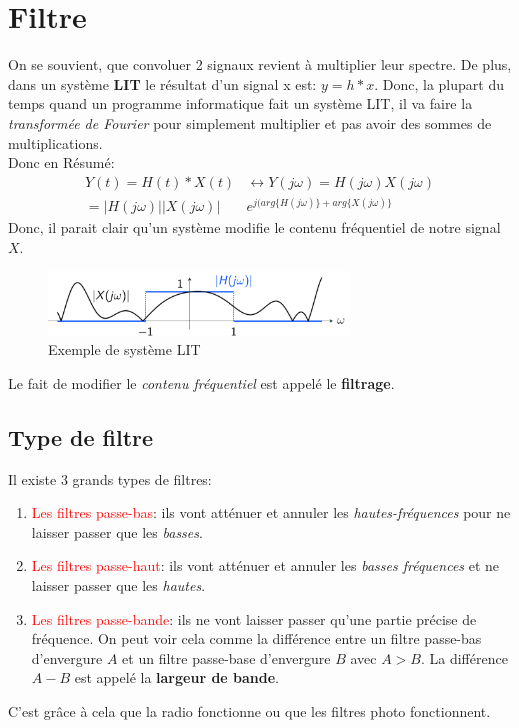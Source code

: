 \documentclass{report}
\begin{document}
\section{Filtre}
On se souvient, que convoluer 2 signaux revient à multiplier leur spectre. De plus, dans un système \textbf{LIT} le résultat d'un signal x est: $y = h\ast x$. Donc, la plupart du temps quand un programme informatique fait un système LIT, il va faire la \textit{transformée de Fourier} pour simplement multiplier et pas avoir des sommes de multiplications.\\
Donc en Résumé:
\begin{align*}
Y(t) = H(t) \ast X(t) &\longleftrightarrow Y(j\omega) = H(j \omega) X(j \omega)\\
=|H(j \omega)||X(j \omega)|&e^{j(arg\{H(j\omega )\}+ arg\{X(j \omega) \}}
\end{align*}
Donc, il parait clair qu'un système modifie le contenu fréquentiel de notre signal $X$.
\begin{figure}[H]
\centering
\includegraphics[width=8cm]{img/signalFreq.png}
\caption{Exemple de système LIT}
\end{figure}
Le fait de modifier le \textit{contenu fréquentiel} est appelé le \textbf{filtrage}.
\subsection{Type de filtre}
Il existe 3 grands types de filtres:
\begin{enumerate}
\item \textcolor{red}{Les filtres passe-bas}: ils vont atténuer et annuler les \textit{hautes-fréquences} pour ne laisser passer que les \textit{basses}.
\item \textcolor{red}{Les filtres passe-haut}: ils vont atténuer et annuler les \textit{basses fréquences} et ne laisser passer que les \textit{hautes}.
\item \textcolor{red}{Les filtres passe-bande}: ils ne vont laisser passer qu'une partie précise de fréquence. On peut voir cela comme la différence entre un filtre passe-bas d'envergure $A$ et un filtre passe-base d'envergure $B$ avec $A>B$. La différence $A-B$ est appelé la \textbf{largeur de bande}. 
\end{enumerate}
C'est grâce à cela que la radio fonctionne ou que les filtres photo fonctionnent.\\
\end{document}
